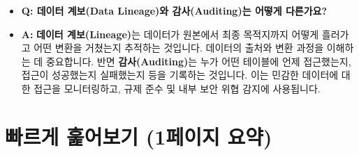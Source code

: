 \documentclass[11pt,a4paper]{article}
\begin{document}
\begin{tcolorbox}[mybox={FAQ: 궁금증 해소}]
\begin{itemize}
    \item \textbf{Q: 데이터 계보(Data Lineage)와 감사(Auditing)는 어떻게 다른가요?}
    \item \textbf{A:} \textbf{데이터 계보(Lineage)}는 데이터가 원본에서 최종 목적지까지 어떻게 흘러가고 어떤 변환을 거쳤는지 추적하는 것입니다. 데이터의 출처와 변환 과정을 이해하는 데 중요합니다. 반면 \textbf{감사(Auditing)}는 누가 어떤 테이블에 언제 접근했는지, 접근이 성공했는지 실패했는지 등을 기록하는 것입니다. 이는 민감한 데이터에 대한 접근을 모니터링하고, 규제 준수 및 내부 보안 위협 감지에 사용됩니다.
\end{itemize}
\end{tcolorbox}

\newpage
\section{빠르게 훑어보기 (1페이지 요약)}
\end{document}
